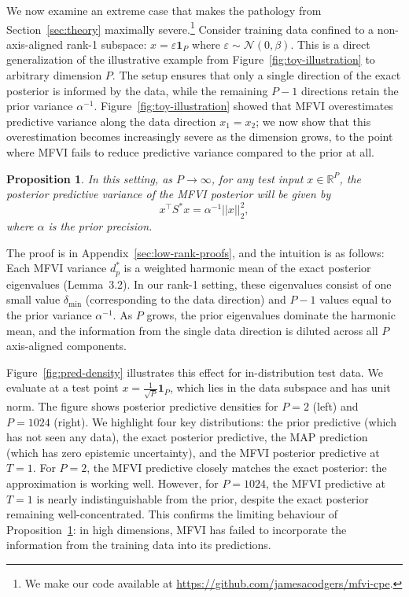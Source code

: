 \documentclass{article}
\theoremstyle{plain}
\newtheorem{proposition}[theorem]{Proposition}
\theoremstyle{definition}
\theoremstyle{remark}
\theoremstyle{plain}
\newcommand{\R}{\mathbb{R}}
\begin{document}
We now examine an extreme case that makes the pathology from Section~\ref{sec:theory} maximally severe.\footnote{We make our code available at \url{https://github.com/jamesacodgers/mfvi-cpe}.} Consider training data confined to a non-axis-aligned rank-1 subspace: $x = \varepsilon \mathbf{1}_P$ where $\varepsilon \sim \mathcal{N}(0, \beta)$. This is a direct generalization of the illustrative example from Figure~\ref{fig:toy-illustration} to arbitrary dimension $P$. The setup ensures that only a single direction of the exact posterior is informed by the data, while the remaining $P-1$ directions retain the prior variance $\alpha^{-1}$. Figure~\ref{fig:toy-illustration} showed that MFVI overestimates predictive variance along the data direction $x_1 = x_2$; we now show that this overestimation becomes increasingly severe as the dimension grows, to the point where MFVI fails to reduce predictive variance compared to the prior at all.

\begin{proposition} \label{th:toy_mfvi_prior_pred}
    In this setting, as $P \to \infty$, for any test input $x\in \R^P$, the posterior predictive variance of the MFVI posterior will be given by 
    \begin{equation}
        x^\top S^* x = \alpha^{-1} || x ||_2^2,
    \end{equation}
    where $\alpha$ is the prior precision. 
\end{proposition}
The proof is in Appendix~\ref{sec:low-rank-proofs}, and the intuition is as follows: Each MFVI variance $d_p^*$ is a weighted harmonic mean of the exact posterior eigenvalues (Lemma~3.2). In our rank-1 setting, these eigenvalues consist of one small value $\delta_{\min}$ (corresponding to the data direction) and $P-1$ values equal to the prior variance $\alpha^{-1}$. As $P$ grows, the prior eigenvalues dominate the harmonic mean, and the information from the single data direction is diluted across all $P$ axis-aligned components.


Figure~\ref{fig:pred-density} illustrates this effect for in-distribution test data. We evaluate at a test point $x = \frac{1}{\sqrt{P}} \mathbf{1}_P$, which lies in the data subspace and has unit norm. The figure shows posterior predictive densities for $P = 2$ (left) and $P = 1024$ (right). We highlight four key distributions: the prior predictive (which has not seen any data), the exact posterior predictive, the MAP prediction (which has zero epistemic uncertainty), and the MFVI posterior predictive at $T=1$. For $P = 2$, the MFVI predictive closely matches the exact posterior: the approximation is working well. However, for $P = 1024$, the MFVI predictive at $T=1$ is nearly indistinguishable from the prior, despite the exact posterior remaining well-concentrated. This confirms the limiting behaviour of Proposition~\ref{th:toy_mfvi_prior_pred}: in high dimensions, MFVI has failed to incorporate the information from the training data into its predictions.
\end{document}

